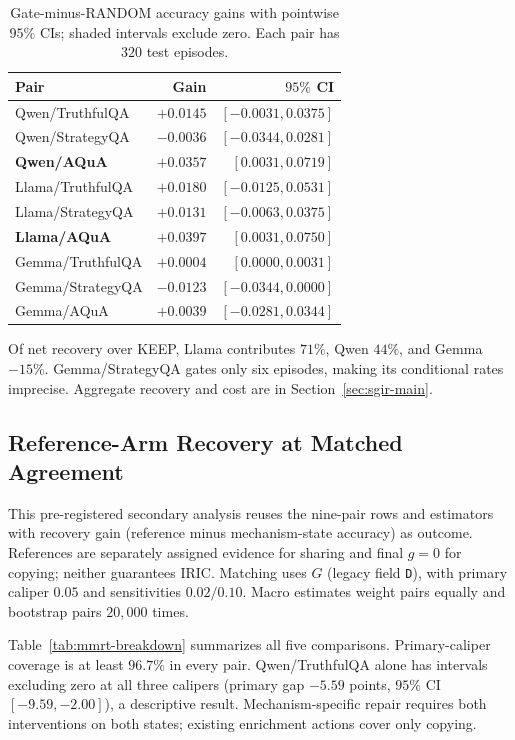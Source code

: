\documentclass[11pt,a4paper]{article}
\theoremstyle{definition}
\newcommand{\resultcell}[1]{{\bfseries\boldmath #1}}
\begin{document}
\begin{table}[H]
\centering\footnotesize
\setlength{\tabcolsep}{3pt}
\renewcommand{\arraystretch}{1.04}
\caption{Gate-minus-RANDOM accuracy gains with pointwise $95\%$ CIs; shaded intervals exclude zero. Each pair has $320$ test episodes.}
\label{tab:sgir-pair-gains}
\begin{tabularx}{\columnwidth}{@{}Zrr@{}}
\toprule
Pair & Gain & $95\%$ CI\\
\midrule
Qwen/TruthfulQA & $+0.0145$ & $[-0.0031,0.0375]$\\
Qwen/StrategyQA & $-0.0036$ & $[-0.0344,0.0281]$\\
\resultcell{Qwen/AQuA} & \resultcell{$+0.0357$} & \resultcell{$[0.0031,0.0719]$}\\
Llama/TruthfulQA & $+0.0180$ & $[-0.0125,0.0531]$\\
Llama/StrategyQA & $+0.0131$ & $[-0.0063,0.0375]$\\
\resultcell{Llama/AQuA} & \resultcell{$+0.0397$} & \resultcell{$[0.0031,0.0750]$}\\
Gemma/TruthfulQA & $+0.0004$ & $[0.0000,0.0031]$\\
Gemma/StrategyQA & $-0.0123$ & $[-0.0344,0.0000]$\\
Gemma/AQuA & $+0.0039$ & $[-0.0281,0.0344]$\\
\bottomrule
\end{tabularx}
\end{table}

Of net recovery over KEEP, Llama contributes $71\%$, Qwen $44\%$, and Gemma $-15\%$. Gemma/StrategyQA gates only six episodes, making its conditional rates imprecise. Aggregate recovery and cost are in Section~\ref{sec:sgir-main}.

\subsection{Reference-Arm Recovery at Matched Agreement}
\label{sec:app-mmrt}

This pre-registered secondary analysis reuses the nine-pair rows and estimators with recovery gain (reference minus mechanism-state accuracy) as outcome. References are separately assigned evidence for sharing and final $g=0$ for copying; neither guarantees IRIC. Matching uses $G$ (legacy field \texttt{D}), with primary caliper $0.05$ and sensitivities $0.02/0.10$. Macro estimates weight pairs equally and bootstrap pairs $20{,}000$ times.

Table~\ref{tab:mmrt-breakdown} summarizes all five comparisons. Primary-caliper coverage is at least $96.7\%$ in every pair. Qwen/TruthfulQA alone has intervals excluding zero at all three calipers (primary gap $-5.59$ points, $95\%$ CI $[-9.59,-2.00]$), a descriptive result. Mechanism-specific repair requires both interventions on both states; existing enrichment actions cover only copying.
\end{document}
